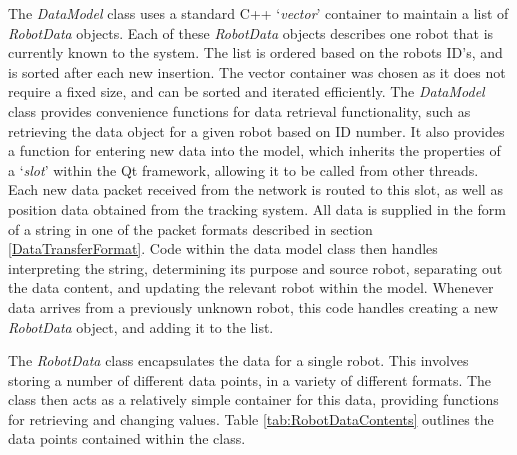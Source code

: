 The \textit{DataModel} class uses a standard C++ `\textit{vector}' container to maintain a list of \textit{RobotData} objects. Each of these \textit{RobotData} objects describes one robot that is currently known to the system. The list is ordered based on the robots ID's, and is sorted after each new insertion. The vector container was chosen as it does not require a fixed size, and can be sorted and iterated efficiently. The \textit{DataModel} class provides convenience functions for data retrieval functionality, such as retrieving the data object for a given robot based on ID number. It also provides a function for entering new data into the model, which inherits the properties of a `\textit{slot}' within the Qt framework, allowing it to be called from other threads. Each new data packet received from the network is routed to this slot, as well as position data obtained from the tracking system. All data is supplied in the form of a string in one of the packet formats described in section \ref{DataTransferFormat}. Code within the data model class then handles interpreting the string, determining its purpose and source robot, separating out the data content, and updating the relevant robot within the model. Whenever data arrives from a previously unknown robot, this code handles creating a new \textit{RobotData} object, and adding it to the list.

The \textit{RobotData} class encapsulates the data for a single robot. This involves storing a number of different data points, in a variety of different formats. The class then acts as a relatively simple container for this data, providing functions for retrieving and changing values. Table \ref{tab:RobotDataContents} outlines the data points contained within the class.

